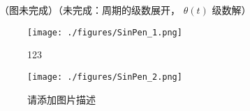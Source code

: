 （图未完成）（未完成：周期的级数展开， $\theta(t)$ 级数解）


\begin{figure}[ht]
\centering
\texttt{[image: ./figures/SinPen\_1.png]}
\caption{123} \label{SinPen_fig1}
\end{figure}
\begin{figure}[ht]
\centering
\texttt{[image: ./figures/SinPen\_2.png]}
\caption{请添加图片描述} \label{SinPen_fig2}
\end{figure}
